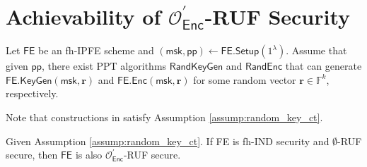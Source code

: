 
\newpage



\iffalse

\section{Achievability of $\mathcal{O}^\prime_{\textsf{Enc}}$-RUF Security}

\begin{assumption}
\label{assump:random_key_ct}

Let $\textsf{FE}$ be an fh-IPFE scheme and $(\textsf{msk}, \textsf{pp}) \gets \textsf{FE.Setup}(1^\lambda)$. Assume that given $\textsf{pp}$, there exist PPT algorithms $\textsf{RandKeyGen}$ and $\textsf{RandEnc}$ that can generate $\textsf{FE.KeyGen}(\textsf{msk}, \mathbf{r})$ and $\textsf{FE.Enc}(\textsf{msk}, \mathbf{r})$ for some random vector $\mathbf{r} \in \mathbb{F}^k$, respectively.

\end{assumption}

Note that constructions in \cite{10.1007/978-3-319-45871-7_24, cryptoeprint:2016/440} satisfy Assumption \ref{assump:random_key_ct}.

\begin{theorem}
\label{thm:fh-IPFE:ind-OEnc-ruf}
Given Assumption \ref{assump:random_key_ct}. If \textsf{FE} is fh-IND security and $\emptyset$-RUF secure, then $\textsf{FE}$ is also $\mathcal{O}^\prime_{\textsf{Enc}}$-RUF secure.

\end{theorem}

